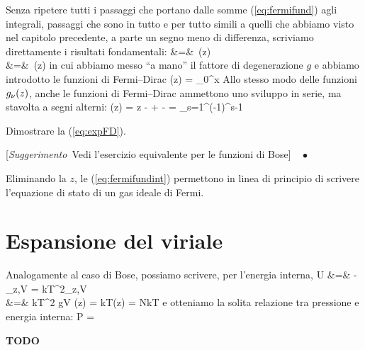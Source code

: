 Senza ripetere tutti i passaggi che portano dalle somme (\ref{eq:fermifund})
agli integrali, passaggi che sono in tutto e per tutto simili a quelli che
abbiamo visto nel capitolo precedente, a parte un segno meno di differenza,
scriviamo direttamente i risultati fondamentali:
\bea
\label{eq:fermifundint}
 &=& \,(z) \nonumber\\
  &=& \,(z)
\eea
in cui abbiamo messo ``a mano'' il fattore di degenerazione $g$ e abbiamo
introdotto le funzioni di Fermi--Dirac
\be
\label{eq:deffFD}
\fFD{\nu}(z) = \int_0^\infty\de x
\ee
Allo stesso modo delle funzioni $g_{\nu}(z)$, anche le funzioni di
Fermi--Dirac ammettono uno sviluppo in serie, ma stavolta a segni alterni:
\be
\label{eq:expFD}
\fFD{\nu}(z) = z -  +  - \cdots
= \sum_{s=1}^\infty (-1)^{s-1} 
\ee
\begin{Exercise}[title={Espansione delle funzioni di Fermi},
label={ex:fermiexp}]
Dimostrare la (\ref{eq:expFD}).

[{\em Suggerimento}\ Vedi l'esercizio equivalente per le funzioni di
Bose]$\quad\bullet$
\end{Exercise}
\noindent
Eliminando la $z$, le (\ref{eq:fermifundint}) permettono in linea di principio
di scrivere l'equazione di stato di un gas ideale di Fermi.

\section{Espansione del viriale}

Analogamente al caso di Bose, possiamo scrivere, per l'energia interna,
\bea
\label{eq:defUFD}
U &=& -\bfrac{\partial\ln\calQ}{\partial\beta}_{z,V} =  
kT^2_{z,V} \nonumber\\
&=& kT^2 gV (z) = 
kT(z) =
NkT
\eea
e otteniamo la solita relazione tra pressione e energia interna:
\be
\label{eq:relUPFD}
P = 
\ee

\textbf{TODO}

